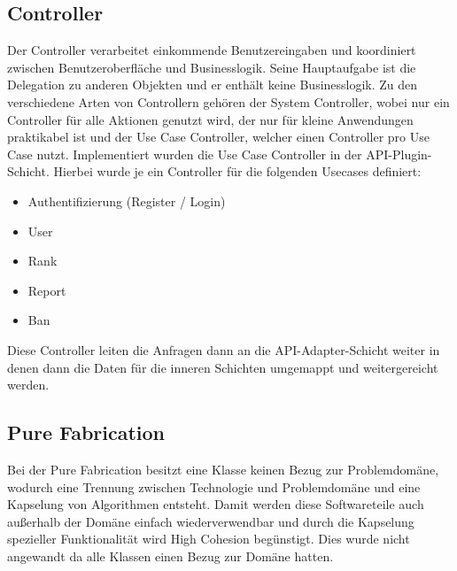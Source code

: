\subsection{Controller}
Der Controller verarbeitet einkommende Benutzereingaben und koordiniert zwischen Benutzeroberfläche und Businesslogik.
Seine Hauptaufgabe ist die Delegation zu anderen Objekten und er enthält keine Businesslogik.
Zu den verschiedene Arten von Controllern gehören der System Controller, wobei nur ein Controller für alle Aktionen genutzt wird, der nur für kleine Anwendungen praktikabel ist
und der Use Case Controller, welcher einen Controller pro Use Case nutzt.
Implementiert wurden die Use Case Controller in der API-Plugin-Schicht.
Hierbei wurde je ein Controller für die folgenden Usecases definiert:

\begin{itemize}
    \item Authentifizierung (Register / Login)
    \item User
    \item Rank
    \item Report
    \item Ban
\end{itemize}

Diese Controller leiten die Anfragen dann an die API-Adapter-Schicht weiter in denen dann die Daten für die inneren Schichten umgemappt und weitergereicht werden.

\subsection{Pure Fabrication}
Bei der Pure Fabrication besitzt eine Klasse keinen Bezug zur Problemdomäne, wodurch eine Trennung zwischen Technologie und Problemdomäne und eine Kapselung von Algorithmen entsteht.
Damit werden diese Softwareteile auch außerhalb der Domäne einfach wiederverwendbar und durch die Kapselung spezieller Funktionalität wird High Cohesion begünstigt.
Dies wurde nicht angewandt da alle Klassen einen Bezug zur Domäne hatten.
